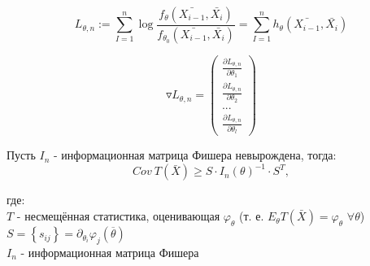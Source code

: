 	$$
	L_{\theta, n} := \sum_{I=1}^{n} \log \frac{f_{\theta}\left(\bar{X_{i-1}}, \bar{X_i}\right)}{f_{\theta_0}\left(\bar{X_{i-1}}, \bar{X_i}\right)} = \sum_{I=1}^{n} h_{\theta}\left(\bar{X_{i-1}}, \bar{X_i}\right)
	$$
	
	$$
	\triangledown L_{\theta, n} = \left(\begin{array}{ccc} \frac{\partial L_{\theta, n}}{\partial \theta_1} \\ \frac{\partial L_{\theta, n}}{\partial \theta_2} \\ ... \\ \frac{\partial L_{\theta, n}}{\partial \theta_l} \end{array}\right)
	$$
	
	\begin{Lemma}\label{CramerRaoInequall}
		Пусть $I_n$ - информационная матрица Фишера невырождена, тогда:
		$$
		Cov\ T\left(\bar{X}\right)\ge S \cdot I_n \left(\theta\right)^{-1}\cdot S^T,
		$$
		\begin{flushleft}
			{\setlength{\leftskip}{5em}
				\setlength{\rightskip}{5em}
		где:
		\\
		$T$ - несмещённая статистика, оценивающая $\varphi_\theta$ (т. е. $E_{\theta}T\left(\bar{X}\right)=\varphi_\theta$ $\forall \theta$)
		\\
		$S=\left\{s_{ij}\right\}=\partial_{\theta_i}\varphi_j\left(\overline{\theta}\right)$
		\\
		$I_n$ - информационная матрица Фишера
		\\
		}
		\end{flushleft}
	\end{Lemma}
	
	\newpage

